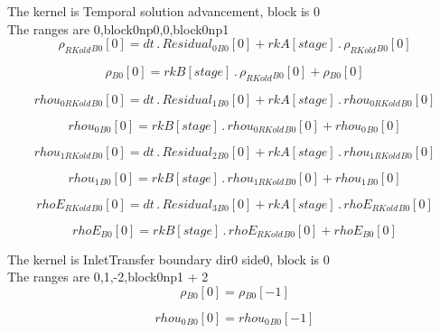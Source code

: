 \documentclass{article}
\begin{document}
\noindent The kernel is Temporal solution advancement, block is 0\\\noindent The ranges are 0,block0np0,0,block0np1\\\begin{dmath}{\rho_{RKold}{_{B0}}}[{0}] = dt \,.\, {Residual_{0}{_{B0}}}[{0}] + {rkA}[{stage}] \,.\, {\rho_{RKold}{_{B0}}}[{0}]\end{dmath}

\begin{dmath}{\rho{_{B0}}}[{0}] = {rkB}[{stage}] \,.\, {\rho_{RKold}{_{B0}}}[{0}] + {\rho{_{B0}}}[{0}]\end{dmath}

\begin{dmath}{rhou_{0 RKold}{_{B0}}}[{0}] = dt \,.\, {Residual_{1}{_{B0}}}[{0}] + {rkA}[{stage}] \,.\, {rhou_{0 RKold}{_{B0}}}[{0}]\end{dmath}

\begin{dmath}{rhou_{0}{_{B0}}}[{0}] = {rkB}[{stage}] \,.\, {rhou_{0 RKold}{_{B0}}}[{0}] + {rhou_{0}{_{B0}}}[{0}]\end{dmath}

\begin{dmath}{rhou_{1 RKold}{_{B0}}}[{0}] = dt \,.\, {Residual_{2}{_{B0}}}[{0}] + {rkA}[{stage}] \,.\, {rhou_{1 RKold}{_{B0}}}[{0}]\end{dmath}

\begin{dmath}{rhou_{1}{_{B0}}}[{0}] = {rkB}[{stage}] \,.\, {rhou_{1 RKold}{_{B0}}}[{0}] + {rhou_{1}{_{B0}}}[{0}]\end{dmath}

\begin{dmath}{rhoE_{RKold}{_{B0}}}[{0}] = dt \,.\, {Residual_{3}{_{B0}}}[{0}] + {rkA}[{stage}] \,.\, {rhoE_{RKold}{_{B0}}}[{0}]\end{dmath}

\begin{dmath}{rhoE{_{B0}}}[{0}] = {rkB}[{stage}] \,.\, {rhoE_{RKold}{_{B0}}}[{0}] + {rhoE{_{B0}}}[{0}]\end{dmath}

\noindent The kernel is InletTransfer boundary dir0 side0, block is 0\\\noindent The ranges are 0,1,-2,block0np1 + 2\\\begin{dmath}{\rho{_{B0}}}[{0}] = {\rho{_{B0}}}[{-1}]\end{dmath}

\begin{dmath}{rhou_{0}{_{B0}}}[{0}] = {rhou_{0}{_{B0}}}[{-1}]\end{dmath}
\end{document}
